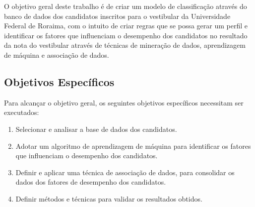 O objetivo geral deste trabalho é de criar um modelo de classificação através do banco de dados dos candidatos inscritos para o vestibular da Universidade Federal de Roraima, com o intuito de criar regras que se possa gerar um perfil e identificar os fatores que influenciam o desempenho dos candidatos no resultado da nota do vestibular através de técnicas de mineração de dados, aprendizagem de máquina e associação de dados.


\subsection{Objetivos Específicos}

Para alcançar o objetivo geral, os seguintes objetivos específicos necessitam ser executados:


\begin{enumerate}
  \item Selecionar e analisar a base de dados dos candidatos.
  \item Adotar um algoritmo de aprendizagem de máquina para identificar os fatores que influenciam o desempenho dos candidatos.
  \item Definir e aplicar uma técnica de associação de dados, para consolidar os dados dos fatores de desempenho dos candidatos.
  \item Definir métodos e técnicas para validar os resultados obtidos.
\end{enumerate}






